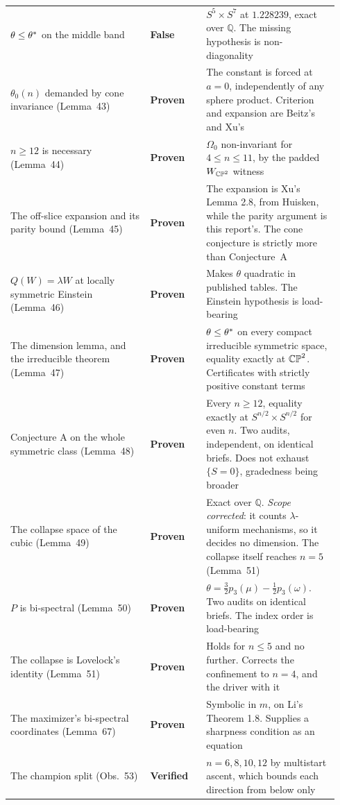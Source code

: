 \begin{longtable}{@{}p{0.40\linewidth}p{0.16\linewidth}p{0.38\linewidth}@{}}
$\theta\le\theta^{*}$ on the middle band & \textbf{False} & $S^5\times S^7$ at $1.228239$, exact over $\mathbb Q$. The missing hypothesis is non-diagonality \\
$\theta_0(n)$ demanded by cone invariance (Lemma~43) & \textbf{Proven} & The constant is forced at $a=0$, independently of any sphere product. Criterion and expansion are Beitz's and Xu's \\
$n\ge12$ is necessary (Lemma~44) & \textbf{Proven} & $\Omega_0$ non-invariant for $4\le n\le11$, by the padded $W_{\mathbb{CP}^2}$ witness \\
The off-slice expansion and its parity bound (Lemma~45) & \textbf{Proven} & The expansion is Xu's Lemma 2.8, from Huisken, while the parity argument is this report's. The cone conjecture is strictly more than Conjecture~A \\
$Q(W)=\lambda W$ at locally symmetric Einstein (Lemma~46) & \textbf{Proven} & Makes $\theta$ quadratic in published tables. The Einstein hypothesis is load-bearing \\
The dimension lemma, and the irreducible theorem (Lemma~47) & \textbf{Proven} & $\theta\le\theta^{*}$ on every compact irreducible symmetric space, equality exactly at $\mathbb{CP}^2$. Certificates with strictly positive constant terms \\
Conjecture A on the whole symmetric class (Lemma~48) & \textbf{Proven} & Every $n\ge12$, equality exactly at $S^{n/2}\times S^{n/2}$ for even $n$. Two audits, independent, on identical briefs. Does not exhaust $\{S=0\}$, gradedness being broader \\
The collapse space of the cubic (Lemma~49) & \textbf{Proven} & Exact over $\mathbb Q$. \emph{Scope corrected}: it counts $\lambda$-uniform mechanisms, so it decides no dimension. The collapse itself reaches $n=5$ (Lemma~51) \\
$P$ is bi-spectral (Lemma~50) & \textbf{Proven} & $\theta=\tfrac32p_3(\mu)-\tfrac12p_3(\omega)$. Two audits on identical briefs. The index order is load-bearing \\
The collapse is Lovelock's identity (Lemma~51) & \textbf{Proven} & Holds for $n\le5$ and no further. Corrects the confinement to $n=4$, and the driver with it \\
The maximizer's bi-spectral coordinates (Lemma~67) & \textbf{Proven} & Symbolic in $m$, on Li's Theorem 1.8. Supplies a sharpness condition as an equation \\
The champion split (Obs.~53) & \textbf{Verified} & $n=6,8,10,12$ by multistart ascent, which bounds each direction from below only \\

\end{longtable}
